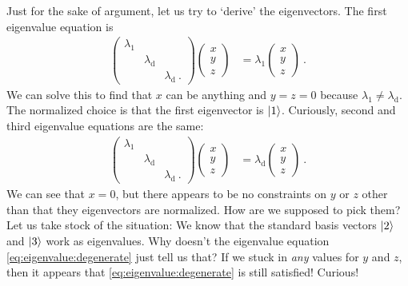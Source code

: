 \documentclass[12pt]{article}
\begin{document}
Just for the sake of argument, let us try to `derive' the eigenvectors. The first eigenvalue equation is
\begin{align}
    \begin{pmatrix}
        \lambda_1 & & \\
        & \lambda_\text{d} & \\
        & & \lambda_\text{d} \ .
    \end{pmatrix}
    \begin{pmatrix}
        x\\y\\z
    \end{pmatrix}
    &= 
    \lambda_1
    \begin{pmatrix}
        x\\y\\z
    \end{pmatrix} \ .
\end{align}
We can solve this to find that $x$ can be anything and $y=z=0$ because $\lambda_1\neq \lambda_\text{d}$. The normalized choice is that the first eigenvector is $\left|1\right\rangle$. Curiously, second and third eigenvalue equations are the same:
\begin{align}
    \begin{pmatrix}
        \lambda_1 & & \\
        & \lambda_\text{d} & \\
        & & \lambda_\text{d} \ .
    \end{pmatrix}
    \begin{pmatrix}
        x\\y\\z
    \end{pmatrix}
    &= 
    \lambda_\text{d}
    \begin{pmatrix}
        x\\y\\z
    \end{pmatrix} \ .
    \label{eq:eigenvalue:degenerate}
\end{align}
We can see that $x=0$, but there appears to be no constraints on $y$ or $z$ other than that they eigenvectors are normalized. How are we supposed to pick them? Let us take stock of the situation: We know that the standard basis vectors $\left|2\right\rangle$ and $\left|3\right\rangle$ work as eigenvalues. Why doesn't the eigenvalue equation \eqref{eq:eigenvalue:degenerate} just tell us that? If we stuck in \emph{any} values for $y$ and $z$, then it appears that \eqref{eq:eigenvalue:degenerate} is still satisfied! Curious!
\end{document}
